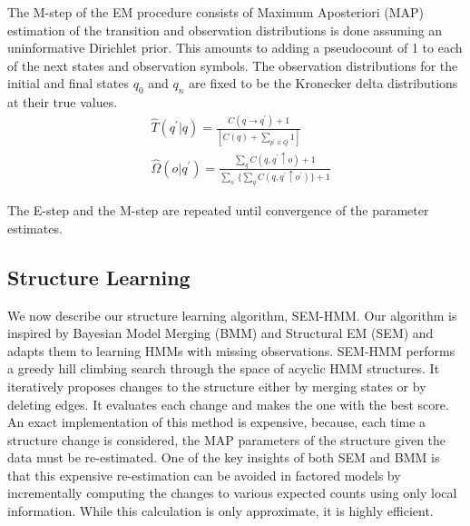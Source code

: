\documentclass[letterpaper]{article}
\begin{document}
The M-step of the EM procedure consists of
Maximum Aposteriori (MAP) estimation of the
transition and observation distributions is done
assuming an uninformative Dirichlet prior. This
amounts to
adding a pseudocount of 1 to each of the next states and observation
symbols.
The observation distributions for the initial and final states $q_0$ and
$q_n$ are fixed to be the Kronecker delta distributions at their true values.
{\footnotesize
\begin{align}
&\hat{T}(q^\prime | q) = \frac{ C(q \rightarrow q^\prime) + 1}{[C(q)+ \sum_{p^{\prime} \in Q} 1]} \\
&\hat{\Omega}(o|q^\prime) = \frac {{\sum_{q} C(q, q^\prime \uparrow o)} + 1} {\sum_{o^\prime} \{ \sum_q C(q,q^\prime \uparrow o^\prime)\} + 1}
\end{align}
}%

The E-step and the M-step are repeated until convergence of the
parameter estimates.

\subsection{Structure Learning}
\label{struct}

We now describe our structure learning algorithm, SEM-HMM.  Our algorithm is inspired by Bayesian Model Merging (BMM) \cite{stolcke1994best} and Structural EM (SEM) \cite{friedman1998bayesian} and adapts them to learning HMMs with missing observations.
SEM-HMM performs a greedy hill climbing search through the space of acyclic
HMM structures. It iteratively proposes changes to the structure either
by merging states or by deleting edges. It evaluates each change and makes the one with the best score.
An exact implementation of this method is expensive, because, each time a structure change is considered, the MAP parameters of the structure given the data must be re-estimated.
One of the key insights of both SEM and BMM is that this expensive
re-estimation can be avoided in factored models by incrementally
computing the changes to various expected counts using only local
information. While this calculation is only approximate, it is highly
efficient.
\end{document}
